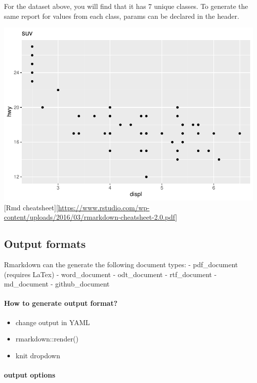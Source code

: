 \documentclass[
]{article}
\providecommand{\tightlist}{%
  \setlength{\itemsep}{0pt}\setlength{\parskip}{0pt}}
\begin{document}
For the dataset above, you will find that it has 7 unique classes. To
generate the same report for values from each class, params can be
declared in the header.

\includegraphics{rmarkdown_tutorial_files/figure-latex/unnamed-chunk-9-1.pdf}
{[}Rmd
cheatsheet{]}{[}\url{https://www.rstudio.com/wp-content/uploads/2016/03/rmarkdown-cheatsheet-2.0.pdf}{]}

\hypertarget{output-formats}{%
\subsection{Output formats}\label{output-formats}}

Rmarkdown can the generate the following document types: - pdf\_document
(requires LaTex) - word\_document - odt\_document - rtf\_document -
md\_document - github\_document

\hypertarget{how-to-generate-output-format}{%
\paragraph{How to generate output
format?}\label{how-to-generate-output-format}}

\begin{itemize}
\tightlist
\item
  change output in YAML
\item
  rmarkdown::render()
\item
  knit dropdown
\end{itemize}

\hypertarget{output-options}{%
\paragraph{output options}\label{output-options}}
\end{document}
